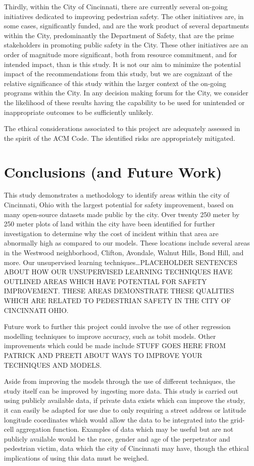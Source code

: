 \documentclass{llncs}
\begin{document}
Thirdly, within the City of Cincinnati, there are currently several on-going initiatives dedicated to improving pedestrian safety. The other initiatives are, in some cases, significantly funded, and are the work product of several departments within the City, predominantly the Department of Safety, that are the prime stakeholders in promoting public safety in the City. These other initiatives are an order of magnitude more significant, both from resource commitment, and for intended impact, than is this study. It is not our aim to minimize the potential impact of the recommendations from this study, but we are cognizant of the relative significance of this study within the larger context of the on-going programs within the City. In any decision making forum for the City, we consider the likelihood of these results having the capability to be used for unintended or inappropriate outcomes to be sufficiently unlikely.

The ethical considerations associated to this project are adequately assessed in the spirit of the ACM Code. The identified risks are appropriately mitigated.
%
\section{Conclusions (and Future Work)}
%

This study demonstrates a methodology to identify areas within the city of Cincinnati, Ohio with the largest potential for safety improvement, based on many open-source datasets made public by the city. Over twenty 250 meter by 250 meter plots of land within the city have been identified for further investigation to determine why the cost of incident within that area are abnormally high as compared to our models. These locations include several areas in the Westwood neighborhood, Clifton, Avondale, Walnut Hills, Bond Hill, and more. Our unsupervised learning techniques…PLACEHOLDER SENTENCES ABOUT HOW OUR UNSUPERVISED LEARNING TECHNIQUES HAVE OUTLINED AREAS WHICH HAVE POTENTIAL FOR SAFETY IMPROVEMENT. THESE AREAS DEMONSTRATE THESE QUALITIES WHICH ARE RELATED TO PEDESTRIAN SAFETY IN THE CITY OF CINCINNATI OHIO.

Future work to further this project could involve the use of other regression modelling techniques to improve accuracy, such as tobit models. Other improvements which could be made include STUFF GOES HERE FROM PATRICK AND PREETI ABOUT WAYS TO IMPROVE YOUR TECHNIQUES AND MODELS.

Aside from improving the models through the use of different techniques, the study itself can be improved by ingesting more data. This study is carried out using publicly available data, if private data exists which can improve the study, it can easily be adapted for use due to only requiring a street address or latitude longitude coordinates which would allow the data to be integrated into the grid-cell aggregation function. Examples of data which may be useful but are not publicly available would be the race, gender and age of the perpetrator and pedestrian victim, data which the city of Cincinnati may have, though the ethical implications of using this data must be weighed. 

%


\end{document}

